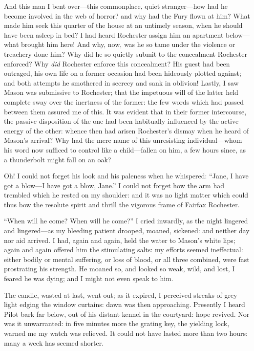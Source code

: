 And this man I bent over---this commonplace, quiet stranger---how had he
become involved in the web of horror? and why had the Fury flown at
him? What made him seek this quarter of the house at an untimely
season, when he should have been asleep in bed? I had heard \Mr{}
 Rochester assign him an apartment below---what brought him here! And
why, now, was he so tame under the violence or treachery done him? Why
did he so quietly submit to the concealment \Mr{} Rochester enforced? Why
\emph{did} \Mr{} Rochester enforce this concealment? His guest had been
outraged, his own life on a former occasion had been hideously plotted
against; and both attempts he smothered in secrecy and sank in
oblivion! Lastly, I saw \Mr{} Mason was submissive to \Mr{} Rochester; that
the impetuous will of the latter held complete sway over the inertness
of the former: the few words which had passed between them assured me of
this. It was evident that in their former intercourse, the passive
disposition of the one had been habitually influenced by the active
energy of the other: whence then had arisen \Mr{} Rochester's dismay when
he heard of \Mr{} Mason's arrival? Why had the mere name of this
unresisting individual---whom his word now sufficed to control like a
child---fallen on him, a few hours since, as a thunderbolt might fall on
an oak?

Oh! I could not forget his look and his paleness when he whispered:
\enquote{Jane, I have got a blow---I have got a blow, Jane.} I could
not forget how the arm had trembled which he rested on my shoulder: and
it was no light matter which could thus bow the resolute spirit and
thrill the vigorous frame of Fairfax Rochester.

\enquote{When will he come? When will he come?} I cried inwardly, as
the night lingered and lingered---as my bleeding patient drooped,
moaned, sickened: and neither day nor aid arrived. I had, again and
again, held the water to Mason's white lips; again and again offered him
the stimulating salts: my efforts seemed ineffectual: either bodily or
mental suffering, or loss of blood, or all three combined, were fast
prostrating his strength. He moaned so, and looked so weak, wild, and
lost, I feared he was dying; and I might not even speak to him.

The candle, wasted at last, went out; as it expired, I perceived streaks
of grey light edging the window curtains: dawn was then approaching. 
Presently I heard Pilot bark far below, out of his distant kennel in the
courtyard: hope revived. Nor was it unwarranted: in five minutes more
the grating key, the yielding lock, warned me my watch was relieved. It
could not have lasted more than two hours: many a week has seemed
shorter.

